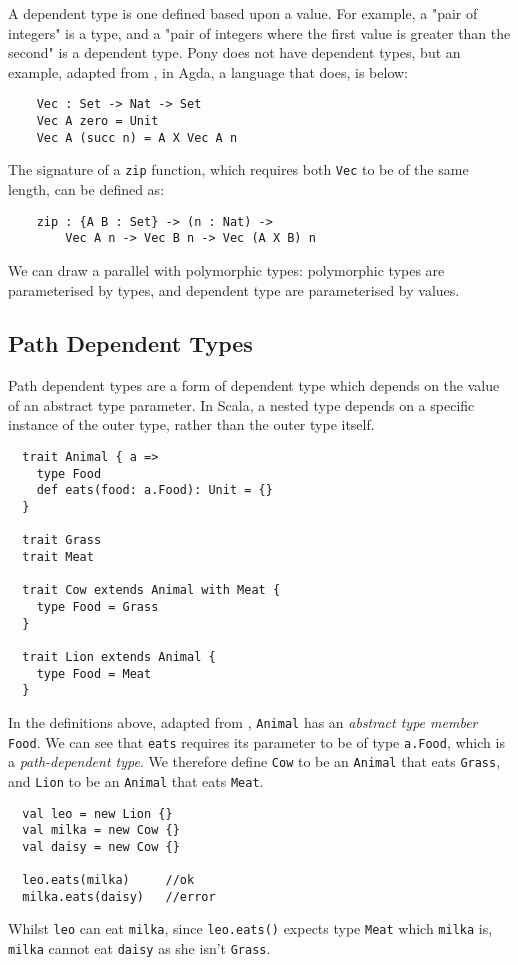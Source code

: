 A dependent type is one defined based upon a value. For example, a "pair of integers" is a type, and a "pair of integers where the first value is greater than the second" is a dependent type. Pony does not have dependent types, but an example, adapted from \cite{Bove2009}, in Agda, a language that does, is below: 
\begin{verbatim}
    Vec : Set -> Nat -> Set
    Vec A zero = Unit
    Vec A (succ n) = A X Vec A n
\end{verbatim}
The signature of a \texttt{zip} function, which requires both \texttt{Vec} to be of the same length, can be defined as:
\begin{verbatim}
    zip : {A B : Set} -> (n : Nat) ->
        Vec A n -> Vec B n -> Vec (A X B) n
\end{verbatim}

We can draw a parallel with polymorphic types: polymorphic types are parameterised by types, and dependent type are parameterised by values.

\subsection{Path Dependent Types}

Path dependent types are a form of dependent type which depends on the value of an abstract type parameter.
In Scala, a nested type depends on a specific instance of the outer type, rather than the outer type itself.
\begin{verbatim}
  trait Animal { a =>
    type Food
    def eats(food: a.Food): Unit = {}
  }

  trait Grass
  trait Meat

  trait Cow extends Animal with Meat {
    type Food = Grass
  }

  trait Lion extends Animal {
    type Food = Meat
  }
\end{verbatim}
In the definitions above, adapted from \cite{Amin2014}, \texttt{Animal} has an \textit{abstract type member} \texttt{Food}. We can see that \texttt{eats} requires its parameter to be of type \texttt{a.Food}, which is a \textit{path-dependent type}. We therefore define \texttt{Cow} to be an \texttt{Animal} that eats \texttt{Grass}, and \texttt{Lion} to be an \texttt{Animal} that eats \texttt{Meat}.
\begin{verbatim}
  val leo = new Lion {}
  val milka = new Cow {}
  val daisy = new Cow {}

  leo.eats(milka)     //ok
  milka.eats(daisy)   //error
\end{verbatim}
Whilst \texttt{leo} can eat \texttt{milka}, since \texttt{leo.eats()} expects type \texttt{Meat} which \texttt{milka} is, \texttt{milka} cannot eat \texttt{daisy} as she isn't \texttt{Grass}.

